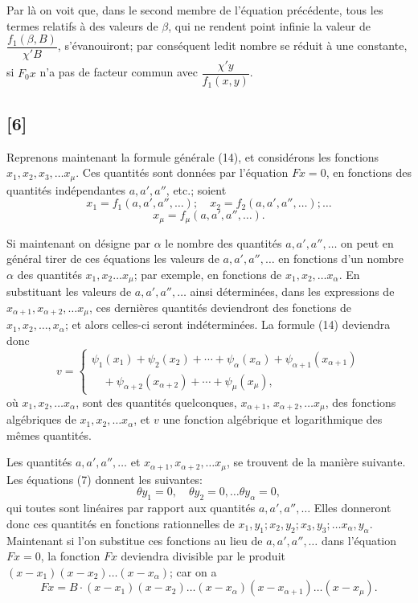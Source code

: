 \documentclass{article}
\begin{document}
Par là on voit que, dans le second membre de l'équation précédente, tous les termes relatifs à des valeurs de $\beta$, qui ne rendent point infinie la valeur de $\dfrac{f_1(\beta,B)}{\chi' B}$, s'évanouiront; par conséquent ledit nombre se réduit à une constante, si $F_0 x$ n'a pas de facteur commun avec $\dfrac{\chi' y}{f_1(x,y)}$.

\subsection*{[6]}

Reprenons maintenant la formule générale (14), et considérons les fonctions $x_1, x_2, x_3, \ldots x_\mu$. Ces quantités sont données par l'équation $F x = 0$, en fonctions des quantités indépendantes $a, a', a''$, etc.; soient
\[ x_1 = f_1(a, a', a'', \ldots); \quad x_2 = f_2(a, a', a'', \ldots); \ldots \]
\[ x_\mu = f_\mu(a, a', a'', \ldots). \]

Si maintenant on désigne par $\alpha$ le nombre des quantités $a, a', a'', \ldots$ on peut en général tirer de ces équations les valeurs de $a, a', a'', \ldots$ en fonctions d'un nombre $\alpha$ des quantités $x_1, x_2 \ldots x_\mu$; par exemple, en fonctions de $x_1, x_2, \ldots x_\alpha$. En substituant les valeurs de $a, a', a'', \ldots$ ainsi déterminées, dans les expressions de $x_{\alpha+1}, x_{\alpha+2}, \ldots x_\mu$, ces dernières quantités deviendront des fonctions de $x_1, x_2, \ldots, x_\alpha$; et alors celles-ci seront indéterminées. La formule (14) deviendra donc
\[ v = \begin{cases} \psi_1(x_1) + \psi_2(x_2) + \cdots + \psi_\alpha(x_\alpha) + \psi_{\alpha+1}(x_{\alpha+1}) \\ \quad + \psi_{\alpha+2}(x_{\alpha+2}) + \cdots + \psi_\mu(x_\mu), \end{cases} \tag{70} \]
où $x_1, x_2, \ldots x_\alpha$, sont des quantités quelconques, $x_{\alpha+1}$,
$x_{\alpha+2}, \ldots x_\mu$, des fonctions algébriques de $x_1, x_2, \ldots x_\alpha$, et $v$ une fonction algébrique et logarithmique des mêmes quantités.

Les quantités $a, a', a'', \ldots$ et $x_{\alpha+1}, x_{\alpha+2}, \ldots x_\mu$, se trouvent de la manière suivante. Les équations (7) donnent les suivantes:
\[ \theta y_1 = 0, \quad \theta y_2 = 0, \ldots \theta y_\alpha = 0, \tag{71} \]
qui toutes sont linéaires par rapport aux quantités $a, a', a'', \ldots$ Elles donneront donc ces quantités en fonctions rationnelles de $x_1, y_1; x_2, y_2; x_3, y_3; \ldots x_\alpha, y_\alpha$. Maintenant si l'on substitue ces fonctions au lieu de $a, a', a'', \ldots$ dans l'équation $F x = 0$, la fonction $F x$ deviendra divisible par le produit $(x-x_1)(x-x_2) \ldots (x-x_\alpha)$; car on a
\[ F x = B \cdot (x-x_1)(x-x_2) \ldots (x-x_\alpha)(x-x_{\alpha+1}) \ldots (x-x_\mu). \]
\end{document}
